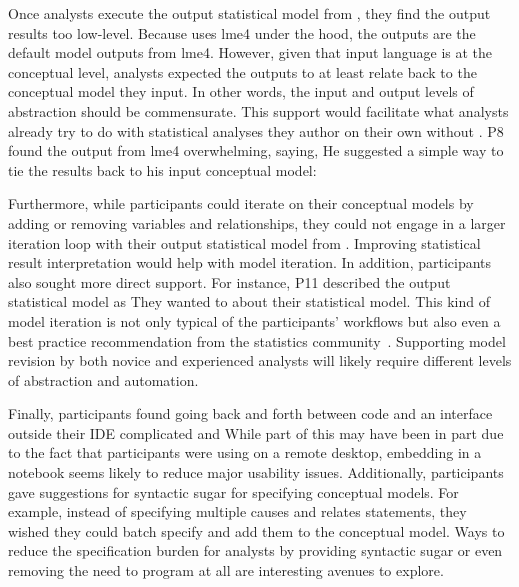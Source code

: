Once analysts execute the output statistical model from \rTisane, they find the
output results too low-level. Because \rTisane uses lme4 under the hood, the
outputs are the default model outputs from lme4. However, given that \rTisanes
input language is at the conceptual level, analysts expected the outputs to at
least relate back to the conceptual model they input. In other words, the input
and output levels of abstraction should be commensurate. This support would
facilitate what analysts already try to do with statistical analyses they author
on their own without \rTisane. P8 found the output from lme4 overwhelming,
saying,  He suggested a
simple way to tie the results back to his input conceptual model: 


Furthermore, while participants could iterate on their conceptual models by
adding or removing variables and relationships, they could not engage in a
larger iteration loop with their output statistical model from \rTisane.
Improving statistical result interpretation would help with model iteration. In
addition, participants also sought more direct support. For instance, P11
described the \rTisane output statistical model as  They wanted to  about their statistical model. This kind of model iteration
is not only typical of the participants' workflows but also even a best practice
recommendation from the statistics community~\cite{gelman2020modelExpansion}.
Supporting model revision by both novice and experienced analysts will likely require different levels of abstraction and automation.

Finally, participants found going back and forth between code and an interface
outside their IDE complicated and  While part of this may have been
in part due to the fact that participants were using \rTisane on a remote
desktop, embedding \rTisane in a notebook seems likely to reduce major usability
issues. Additionally, participants gave suggestions for syntactic sugar for
specifying conceptual models. For example, instead of specifying multiple causes
and relates statements, they wished they could batch specify and add them to the
conceptual model. Ways to reduce the specification burden for analysts by
providing syntactic sugar or even removing the need to program at all are
interesting avenues to explore. 
